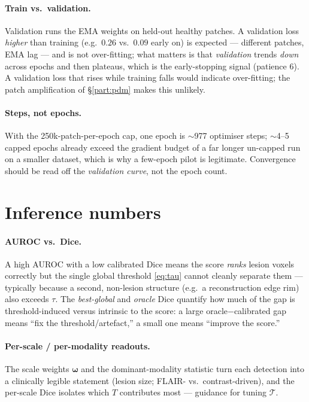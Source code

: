 \paragraph{Train vs.\ validation.} Validation runs the EMA weights on held-out
healthy patches. A validation loss \emph{higher} than training (e.g.\ $0.26$ vs.\
$0.09$ early on) is expected --- different patches, EMA lag --- and is not
over-fitting; what matters is that \emph{validation} trends \emph{down} across
epochs and then plateaus, which is the early-stopping signal (patience $6$). A
validation loss that rises while training falls would indicate over-fitting; the
patch amplification of \S\ref{part:pdm} makes this unlikely.
\paragraph{Steps, not epochs.} With the 250k-patch-per-epoch cap, one epoch is
$\sim$977 optimiser steps; $\sim$4--5 capped epochs already exceed the gradient
budget of a far longer un-capped run on a smaller dataset, which is why a
few-epoch pilot is legitimate. Convergence should be read off the
\emph{validation curve}, not the epoch count.

\section{Inference numbers}
\paragraph{AUROC vs.\ Dice.} A high AUROC with a low calibrated Dice means the
score \emph{ranks} lesion voxels correctly but the single global threshold
\eqref{eq:tau} cannot cleanly separate them --- typically because a second,
non-lesion structure (e.g.\ a reconstruction edge rim) also exceeds $\tau$. The
\emph{best-global} and \emph{oracle} Dice quantify how much of the gap is
threshold-induced versus intrinsic to the score: a large oracle$-$calibrated gap
means ``fix the threshold/artefact,'' a small one means ``improve the score.''
\paragraph{Per-scale / per-modality readouts.} The scale weights $\bm\omega$ and
the dominant-modality statistic turn each detection into a clinically legible
statement (lesion size; FLAIR- vs.\ contrast-driven), and the per-scale Dice
isolates which $T$ contributes most --- guidance for tuning $\mathcal T$.
